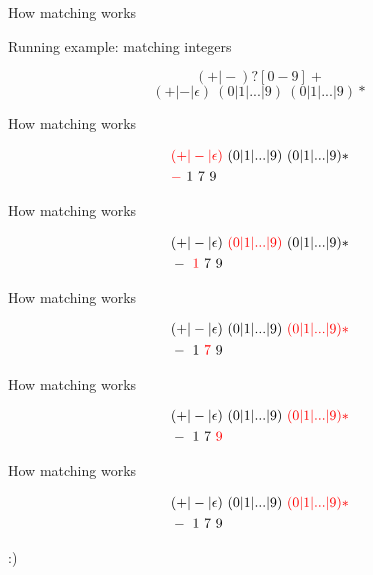 \documentclass{beamer}
\renewcommand\big[1]{
  \begin{center}
    \Large{#1}
  \end{center}
}
\begin{document}
\begin{frame}
  \big{How matching works}

  Running example: matching integers

  \[
    (+ \vert -)?[0-9]+
  \]
  \pause
  \[
    (+ \vert - \vert \epsilon)~(0 \vert 1 \vert ... \vert 9)~(0 \vert 1 \vert ... \vert 9)*
  \]
\end{frame}


\begin{frame}
  \big{How matching works}

  \begin{align*}
    & \textcolor{red}{(+ \vert - \vert \epsilon)}~(0 \vert 1 \vert ... \vert 9)~(0 \vert 1 \vert ... \vert 9)* \\
    & \textcolor{red}{-}~1~7~9
  \end{align*}
\end{frame}

\begin{frame}
  \big{How matching works}

  \begin{align*}
    & (+ \vert - \vert \epsilon)~\textcolor{red}{(0 \vert 1 \vert ... \vert 9)}~(0 \vert 1 \vert ... \vert 9)* \\
    & -~\textcolor{red}{1}~7~9
  \end{align*}
\end{frame}

\begin{frame}
  \big{How matching works}

  \begin{align*}
    & (+ \vert - \vert \epsilon)~(0 \vert 1 \vert ... \vert 9)~\textcolor{red}{(0 \vert 1 \vert ... \vert 9)*} \\
    & -~1~\textcolor{red}{7}~9
  \end{align*}
\end{frame}

\begin{frame}
  \big{How matching works}

  \begin{align*}
    & (+ \vert - \vert \epsilon)~(0 \vert 1 \vert ... \vert 9)~\textcolor{red}{(0 \vert 1 \vert ... \vert 9)*} \\
    & -~1~7~\textcolor{red}{9}
  \end{align*}
\end{frame}

\begin{frame}
  \big{How matching works}

  \begin{align*}
    & (+ \vert - \vert \epsilon)~(0 \vert 1 \vert ... \vert 9)~\textcolor{red}{(0 \vert 1 \vert ... \vert 9)*} \\
    & -~1~7~9
  \end{align*}

  \centering\Huge{:)}
\end{frame}
\end{document}
